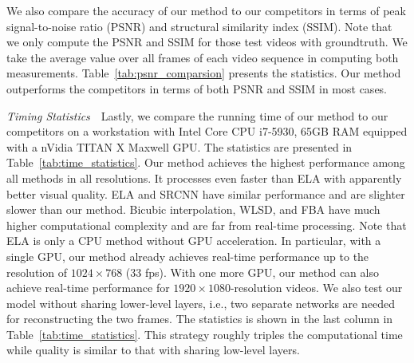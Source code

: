 \documentclass[acmtog]{acmart}
\begin{document}
We also compare the accuracy of our method to our competitors in terms of peak
signal-to-noise ratio (PSNR) and structural similarity index (SSIM). Note that
we only compute the PSNR and SSIM for those test videos with groundtruth. We
take the average value over all frames of each video sequence in computing both
measurements. Table~\ref{tab:psnr_comparsion} presents the statistics. Our
method outperforms the competitors in terms of both PSNR
and SSIM in most cases.

\vspace{0.15in}\noindent\emph{Timing Statistics}\,\,\,\,%
Lastly, we compare the running time of our method to our competitors on a
workstation with Intel Core CPU i7-5930, 65GB RAM equipped with a nVidia TITAN X
Maxwell GPU. The statistics are presented in Table~\ref{tab:time_statistics}.
Our method achieves the highest performance among all methods in all
resolutions. It processes even faster than ELA with apparently better visual
quality. ELA and SRCNN have similar performance and are slighter slower than our
method. Bicubic interpolation, WLSD, and FBA have much higher computational
complexity and are far from real-time processing.  Note that ELA is only a CPU
method without GPU acceleration. In particular, with a single GPU, our method
already achieves real-time performance up to the resolution of $1024\times 768$
(33 fps). With one more GPU, our method can also achieve real-time performance
for $1920\times 1080$-resolution videos. We also test our model without sharing
lower-level layers, i.e., two separate networks are needed for reconstructing
the two frames. The statistics is shown in the last column in
Table~\ref{tab:time_statistics}. This strategy roughly triples the computational
time while quality is similar to that with sharing low-level layers.
\end{document}
